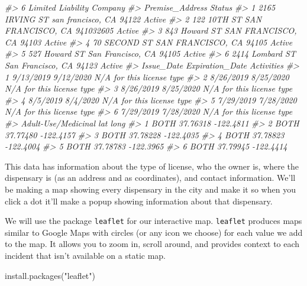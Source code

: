 \documentclass[
]{krantz}
\makeatletter
\newenvironment{Shaded}{\begin{snugshade}}{\end{snugshade}}
\newcommand{\CommentTok}[1]{\textcolor[rgb]{0.37,0.37,0.37}{\textit{#1}}}
\newcommand{\FunctionTok}[1]{\textcolor[rgb]{0,0,0}{#1}}
\newcommand{\NormalTok}[1]{#1}
\newcommand{\StringTok}[1]{\textcolor[rgb]{0.5,0.5,0.5}{#1}}
\newenvironment{kframe}{%
\medskip{}
\setlength{\fboxsep}{.8em}
 \def\at@end@of@kframe{}%
 \ifinner\ifhmode%
  \def\at@end@of@kframe{\end{minipage}}%
  \begin{minipage}{\columnwidth}%
 \fi\fi%
 \def\FrameCommand##1{\hskip\@totalleftmargin \hskip-\fboxsep
 \colorbox{shadecolor}{##1}\hskip-\fboxsep
     \hskip-\linewidth \hskip-\@totalleftmargin \hskip\columnwidth}%
 \MakeFramed {\advance\hsize-\width
   \@totalleftmargin\z@ \linewidth\hsize
   \@setminipage}}%
 {\par\unskip\endMakeFramed%
 \at@end@of@kframe}
\renewenvironment{Shaded}{\begin{kframe}}{\end{kframe}}
\makeatother
\begin{document}
\begin{Shaded}
\begin{Highlighting}[]
\CommentTok{\#\textgreater{} 6 Limited Liability Company}
\CommentTok{\#\textgreater{}                           Premise\_Address Status}
\CommentTok{\#\textgreater{} 1  2165 IRVING ST san francisco, CA 94122 Active}
\CommentTok{\#\textgreater{} 2 122 10TH ST SAN FRANCISCO, CA 941032605 Active}
\CommentTok{\#\textgreater{} 3   843 Howard ST SAN FRANCISCO, CA 94103 Active}
\CommentTok{\#\textgreater{} 4    70 SECOND ST SAN FRANCISCO, CA 94105 Active}
\CommentTok{\#\textgreater{} 5   527 Howard ST San Francisco, CA 94105 Active}
\CommentTok{\#\textgreater{} 6 2414 Lombard ST San Francisco, CA 94123 Active}
\CommentTok{\#\textgreater{}   Issue\_Date Expiration\_Date                Activities}
\CommentTok{\#\textgreater{} 1  9/13/2019       9/12/2020 N/A for this license type}
\CommentTok{\#\textgreater{} 2  8/26/2019       8/25/2020 N/A for this license type}
\CommentTok{\#\textgreater{} 3  8/26/2019       8/25/2020 N/A for this license type}
\CommentTok{\#\textgreater{} 4   8/5/2019        8/4/2020 N/A for this license type}
\CommentTok{\#\textgreater{} 5  7/29/2019       7/28/2020 N/A for this license type}
\CommentTok{\#\textgreater{} 6  7/29/2019       7/28/2020 N/A for this license type}
\CommentTok{\#\textgreater{}   Adult{-}Use/Medicinal      lat      long}
\CommentTok{\#\textgreater{} 1                BOTH 37.76318 {-}122.4811}
\CommentTok{\#\textgreater{} 2                BOTH 37.77480 {-}122.4157}
\CommentTok{\#\textgreater{} 3                BOTH 37.78228 {-}122.4035}
\CommentTok{\#\textgreater{} 4                BOTH 37.78823 {-}122.4004}
\CommentTok{\#\textgreater{} 5                BOTH 37.78783 {-}122.3965}
\CommentTok{\#\textgreater{} 6                BOTH 37.79945 {-}122.4414}
\end{Highlighting}
\end{Shaded}

This data has information about the type of license, who the owner is, where the dispensary is (as an address and as coordinates), and contact information. We'll be making a map showing every dispensary in the city and make it so when you click a dot it'll make a popup showing information about that dispensary.

We will use the package \texttt{leaflet} for our interactive map. \texttt{leaflet} produces maps similar to Google Maps with circles (or any icon we choose) for each value we add to the map. It allows you to zoom in, scroll around, and provides context to each incident that isn't available on a static map.

\begin{Shaded}
\begin{Highlighting}[]
\FunctionTok{install.packages}\NormalTok{(}\StringTok{"leaflet"}\NormalTok{)}
\end{Highlighting}
\end{Shaded}
\end{document}
